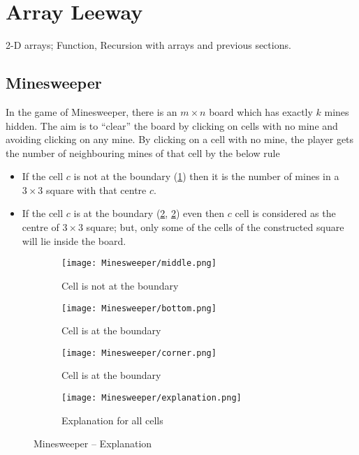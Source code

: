 \section{Array Leeway}
\begin{topics}
2-D arrays; Function, Recursion with arrays and previous sections.
\end{topics}
\subsection{Minesweeper}
In the game of Minesweeper, there is an $m\times n$ board which has exactly $k$ mines hidden. The aim is to ``clear'' the board by clicking on cells with no mine and avoiding clicking on any mine. By clicking on a cell with no mine, the player gets the number of neighbouring mines of that cell by the below rule
\begin{itemize}	
	\item If the cell $c$ is not at the boundary (\ref{fig:minecnb}) then it is the number of mines in a $3\times3$ square with that centre $c$.
	\item If the cell $c$ is at the boundary (\ref{fig:minecb1}, \ref{fig:minecb1}) even then $c$ cell is considered as the centre of $3\times3$ square; but, only some of the cells of the constructed square will lie inside the board.
\end{itemize}
\begin{figure}[H]
	\centering
	\begin{subfigure}[t]{0.26\linewidth}
		\centering
		\texttt{[image: Minesweeper/middle.png]}
		\caption{Cell is not at the boundary}
		\label{fig:minecnb}
	\end{subfigure}
	\begin{subfigure}[t]{0.22\linewidth}
		\centering
		\texttt{[image: Minesweeper/bottom.png]}
		\caption{Cell is at the boundary}
		\label{fig:minecb1}
	\end{subfigure}
	\begin{subfigure}[t]{0.22\linewidth}
		\centering
		\texttt{[image: Minesweeper/corner.png]}
		\caption{Cell is at the boundary}
		\label{fig:minecb2}
	\end{subfigure}
	\begin{subfigure}[t]{0.23\linewidth}
		\centering
		\texttt{[image: Minesweeper/explanation.png]}
		\caption{Explanation for all cells}
		\label{fig:minee}
	\end{subfigure}
	\caption{Minesweeper -- Explanation}
\end{figure}
